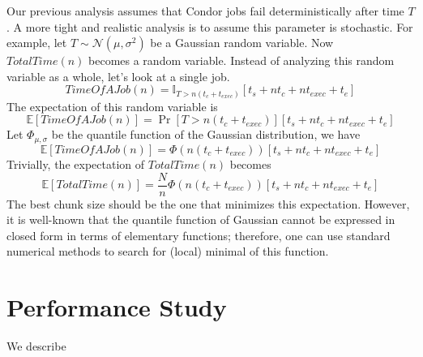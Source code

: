 \documentclass[11pt]{article}
\begin{document}
Our previous analysis assumes that Condor jobs fail
deterministically after time $T$. A more tight and realistic
analysis is to assume this parameter is stochastic. For example,
let $T\sim\mathcal{N}(\mu, \sigma^2)$ be a Gaussian random variable.
Now $TotalTime(n)$ becomes a random variable.
Instead of analyzing this random variable as a whole, let's
look at a single job.
\[
TimeOfAJob(n) = \mathbb{I}_{T>n(t_c+t_{exec})} \left[ t_s + nt_c + nt_{exec}  + t_e \right]
\]
The expectation of this random variable is
\[
\mathbb{E}\left[TimeOfAJob(n)\right] = \Pr[T>n(t_c+t_{exec})] \left[ t_s + nt_c + nt_{exec}  + t_e \right]
\]
Let $\Phi_{\mu,\sigma}$ be the quantile function
of the Gaussian distribution, we have
\[
\mathbb{E}\left[TimeOfAJob(n)\right] = \Phi(n(t_c+t_{exec})) \left[ t_s + nt_c + nt_{exec}  + t_e \right]
\]
Trivially, the expectation of $TotalTime(n)$ becomes
\[
\mathbb{E}\left[TotalTime(n)\right] = \frac{N}{n} \Phi(n(t_c+t_{exec})) \left[ t_s + nt_c + nt_{exec}  + t_e \right]
\]
The best chunk size should be the one that minimizes this 
expectation. However, it is well-known that the quantile
function of Gaussian cannot be expressed in closed form in 
terms of elementary functions; therefore, one can use
standard numerical methods to search for (local) minimal
of this function.


\section{Performance Study}

We describe 






\end{document}
